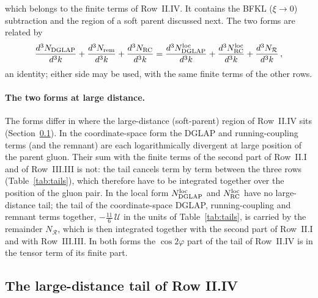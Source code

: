 which belongs to the finite terms of Row~II.IV. It contains the BFKL ($\xi\to0$) subtraction and the region of a soft parent discussed next. The two forms are related by
\begin{align}\label{eq:dg_equiv}
\frac{d^3N_{\rm DGLAP}}{d^3k}+\frac{d^3N_{\rm rem}}{d^3k}+\frac{d^3N_{\rm RC}}{d^3k}=\frac{d^3N^{\rm loc}_{\rm DGLAP}}{d^3k}+\frac{d^3N^{\rm loc}_{\rm RC}}{d^3k}+\frac{d^3N_{\mathcal R}}{d^3k}\,,
\end{align}
an identity; either side may be used, with the same finite terms of the other rows.

\paragraph{The two forms at large distance.} The forms differ in where the large-distance (soft-parent) region of Row~II.IV sits (Section~\ref{sec:dg_tail}). In the coordinate-space form the DGLAP and running-coupling terms (and the remnant) are each logarithmically divergent at large position of the parent gluon. Their sum with the finite terms of the second part of Row~II.I and of Row~III.III is not: the tail cancels term by term between the three rows (Table~\ref{tab:tails}), which therefore have to be integrated together over the position of the gluon pair. In the local form $N^{\rm loc}_{\rm DGLAP}$ and $N^{\rm loc}_{\rm RC}$ have no large-distance tail; the tail of the coordinate-space DGLAP, running-coupling and remnant terms together, $-\frac{11}{6}\,\mathcal U$ in the units of Table~\ref{tab:tails}, is carried by the remainder $N_{\mathcal R}$, which is then integrated together with the second part of Row~II.I and with Row~III.III. In both forms the $\cos2\varphi$ part of the tail of Row~II.IV is in the tensor term of its finite part.

\subsection{The large-distance tail of Row II.IV}\label{sec:dg_tail}

